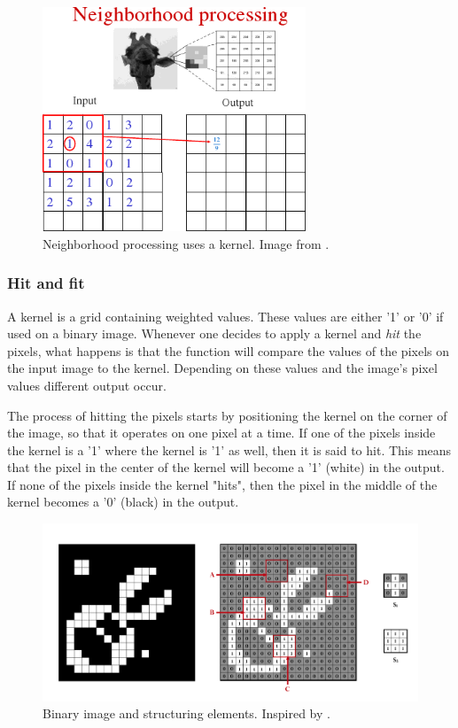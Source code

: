 \begin{figure}[htbp]
\centering
\includegraphics[width=0.7\textwidth]{Pictures/Theory/kernel}
\caption{Neighborhood processing uses a kernel. Image from \citep{ip_book}.}
\label{fig:kernel}
\end{figure}

\subsubsection{Hit and fit}
A kernel is a grid containing weighted values. These values are either '1' or '0' if used on a binary image. Whenever one decides to apply a kernel and \textit{hit} the pixels, what happens is that the function will compare the values of the pixels on the input image to the kernel. Depending on these values and the image's pixel values different output occur.

The process of hitting the pixels starts by positioning the kernel on the corner of the image, so that it operates on one pixel at a time. If one of the pixels inside the kernel is a '1' where the kernel is '1' as well, then it is said to hit. This means that the pixel in the center of the kernel will become a '1' (white) in the output. If none of the pixels inside the kernel "hits", then the pixel in the middle of the kernel becomes a '0' (black) in the output.

\begin{figure}[htbp]
\centering
\includegraphics[width=1\textwidth]{Pictures/Theory/FitHitKernels.png}
\caption{Binary image and structuring elements. Inspired by \citep{ip_book}.}
\label{fig:FitHit}
\end{figure}

